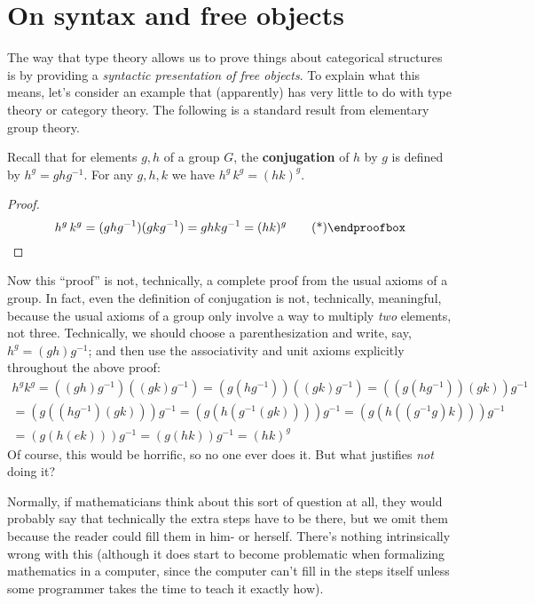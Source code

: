 \section{On syntax and free objects}
\label{sec:syntax}

The way that type theory allows us to prove things about categorical structures is by providing a \emph{syntactic presentation of free objects}.
To explain what this means, let's consider an example that (apparently) has very little to do with type theory or category theory.
The following is a standard result from elementary group theory.

\begin{thm}\label{thm:intro-conjugation}
  Recall that for elements $g,h$ of a group $G$, the \textbf{conjugation} of $h$ by $g$ is defined by $h^g = g h g^{-1}$.
  For any $g,h,k$ we have $h^g\,k^g = (hk)^g$.
\end{thm}
\begin{proof}
  \[ h^g\,k^g = (g h g^{-1})(g k g^{-1}) = g h k g^{-1} = (hk)^g \qedhere \]
\end{proof}

Now this ``proof'' is not, technically, a complete proof from the usual axioms of a group.
In fact, even the definition of conjugation is not, technically, meaningful, because the usual axioms of a group only involve a way to multiply \emph{two} elements, not three.
Technically, we should choose a parenthesization and write, say, $h^g = (g h) g^{-1}$; and then use the associativity and unit axioms explicitly throughout the above proof:
\begin{multline*}
  h^g k^g
  = ((g h) g^{-1})((g k) g^{-1})
  = (g (h g^{-1}))((g k) g^{-1})
  = ((g (h g^{-1}))(g k)) g^{-1}\\
  = (g ((h g^{-1})(g k))) g^{-1}
  = (g (h (g^{-1}(g k)))) g^{-1}
  = (g (h ((g^{-1} g) k))) g^{-1}\\
  = (g (h (e k))) g^{-1}
  = (g (h k)) g^{-1}
  = (h k)^g
\end{multline*}
Of course, this would be horrific, so no one ever does it.
But what justifies \emph{not} doing it?

Normally, if mathematicians think about this sort of question at all, they would probably say that technically the extra steps have to be there, but we omit them because the reader could fill them in him- or herself.
There's nothing intrinsically wrong with this (although it does start to become problematic when formalizing mathematics in a computer, since the computer can't fill in the steps itself unless some programmer takes the time to teach it exactly how).

